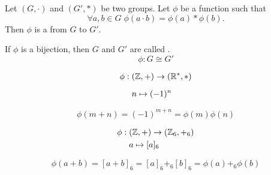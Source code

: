 
\begin{frame}
  \begin{definition}[Homomorphism (同态)]
    Let $(G, \cdot)$ and $(G', \ast)$ be two groups.
    Let $\phi$ be a function such that
    \[
      \forall a, b \in G\; \phi(a \cdot b) = \phi(a) \ast \phi(b).
    \]
    Then $\phi$ is a  from $G$ to $G'$.
  \end{definition}

  \pause
  \vspace{0.50cm}
  \begin{center}
    If $\phi$ is a bijection, then $G$ and $G'$ are called .
    \[
      \phi: G \cong G'
    \]
  \end{center}
\end{frame}

%

%

\begin{frame}{}
  \begin{align*}
    \phi:\; & (\mathbb{Z}, +) \to (\mathbb{R}^{\ast}, \ast) \\[6pt]
            & n \mapsto (-1)^{n}
  \end{align*}

  \pause
  \[
    \phi(m + n) = (-1)^{m+n} = \phi(m) \phi(n)
  \]
\end{frame}

\begin{frame}{}
  \begin{align*}
    \phi:\; & (\mathbb{Z}, +) \to (\mathbb{Z}_{6}, +_{6}) \\
            & a \mapsto [a]_{6}
  \end{align*}

  \[
    \phi(a + b) = [a + b]_{6} = [a]_{6} +_{6} [b]_{6}
      = \phi(a) +_{6} \phi(b)
  \]
\end{frame}

